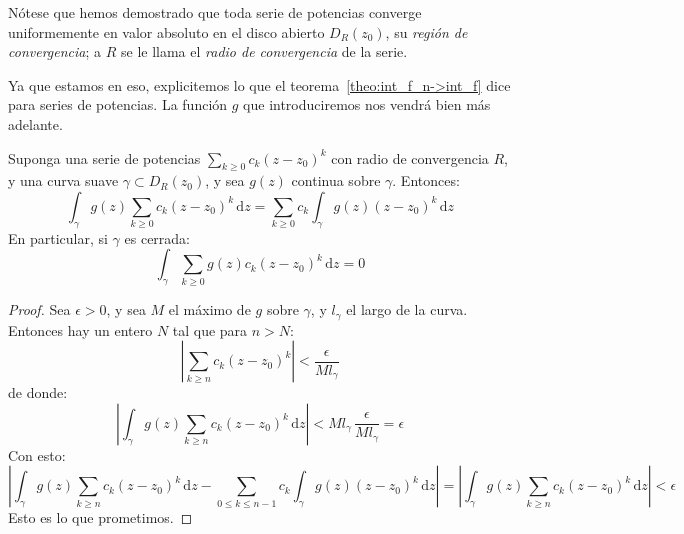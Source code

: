   Nótese que hemos demostrado que toda serie de potencias
  converge uniformemente en valor absoluto
  en el disco abierto \(D_R(z_0)\),
  su \emph{región de convergencia};
  a \(R\) se le llama el \emph{radio de convergencia} de la serie.

  Ya que estamos en eso,
  explicitemos lo que el teorema~\ref{theo:int_f_n->int_f}
  dice para series de potencias.
  La función \(g\) que introduciremos nos vendrá bien más adelante.
  \begin{corollary}
    \label{cor:power-series-integrate-termwise}
    Suponga una serie de potencias
      \(\sum_{k \ge 0} c_k (z - z_0)^k\)
    con radio de convergencia \(R\),
    y una curva suave \(\gamma \subset D_R(z_0)\),
    y sea \(g(z)\) continua
    sobre \(\gamma\).
    Entonces:
    \begin{equation*}
      \int_\gamma g(z) \sum_{k \ge 0} c_k (z - z_0)^k
	  \, \mathrm{d} z
	= \sum_{k \ge 0} c_k \int_\gamma g(z) (z - z_0)^k
	    \, \mathrm{d} z
    \end{equation*}
    En particular,
    si \(\gamma\) es cerrada:
    \begin{equation*}
      \int_\gamma \sum_{k \ge 0} g(z) c_k (z - z_0)^k
	  \, \mathrm{d} z
	= 0
    \end{equation*}
  \end{corollary}
  \begin{proof}
    Sea \(\epsilon > 0\),
    y sea \(M\) el máximo de \(g\) sobre \(\gamma\),
    y \(l_\gamma\) el largo de la curva.
    Entonces hay un entero \(N\) tal que para \(n > N\):
    \begin{equation*}
      \left\lvert
	\sum_{k \ge n} c_k (z - z_0)^k
      \right\rvert
	< \frac{\epsilon}{M l_\gamma}
    \end{equation*}
    de donde:
    \begin{equation*}
      \left\lvert
	\int_\gamma g(z) \sum_{k \ge n} c_k (z - z_0)^k
	  \, \mathrm{d} z
      \right\rvert
	< M l_\gamma \, \frac{\epsilon}{M l_\gamma}
	= \epsilon
    \end{equation*}
    Con esto:
    \begin{equation*}
      \left\lvert
	\int_\gamma g(z) \sum_{k \ge n} c_k (z - z_0)^k
	  \, \mathrm{d} z
	  - \sum_{0 \le k \le n - 1}
	      c_k \int_\gamma g(z) (z - z_0)^k \, \mathrm{d} z
      \right\rvert
	= \left\lvert
	    \int_\gamma g(z) \sum_{k \ge n} c_k (z - z_0)^k
	      \, \mathrm{d} z
	  \right\rvert
	< \epsilon
    \end{equation*}
    Esto es lo que prometimos.
  \end{proof}

